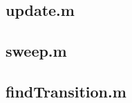 \documentclass[11pt]{article} %
\begin{document}
\subsection{update.m}
\label{sec:update}

\bigskip
\bigskip
\bigskip

\subsection{sweep.m}
\label{sec:sweep}

\bigskip
\bigskip
\bigskip

\subsection{findTransition.m}
\label{sec:findtrans}

\end{document}
